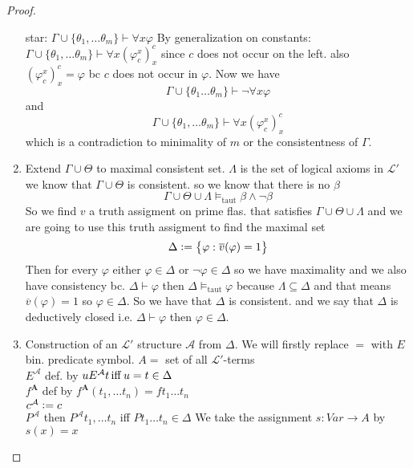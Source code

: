 \begin{proof}
\begin{enumerate}
\begin{claimproof}
            star: $\Gamma \cup \{\theta_1,\dots \theta_m\}\vdash \forall x \varphi$
            By generalization on constants:
            $\Gamma \cup \{\theta_1,\dots \theta_m\}\vdash \forall x (\varphi_c^x)^c_x$
            since $c$ does not occur on the left.
            also $(\varphi^x_c)^c_x = \varphi$ bc $c$ does not occur in $\varphi$.
            Now we have 
            $$\Gamma\cup \{\theta_1 \dots \theta_{m}\}\vdash \lnot \forall x \varphi$$
            and 
            $$\Gamma \cup \{\theta_1,\dots \theta_m\}\vdash \forall x (\varphi_c^x)^c_x$$ 
            which is a contradiction to minimality of $m$ or the consistentness of $\Gamma$.
        \end{claimproof}
        \item Extend $\Gamma \cup \Theta$ to maximal consistent set.
        $\Lambda$ is the set of logical axioms in $\mathcal{L}'$ we know that $\Gamma\cup \Theta$ is consistent. so we know that there is no $\beta$ 
        \[\Gamma \cup \Theta \cup \Lambda  \models_{\text{taut}} \beta \land \lnot \beta\]
        So we find $v$ a truth assigment on prime flas. that satisfies $\Gamma \cup \Theta \cup \Lambda$ and we are going to use this truth assigment to find the maximal set 
        \[\Delta \vcentcolon= \bigl\{\varphi : \overline{v}(\varphi)=1\bigr\}\]
        Then for every $\varphi$ either $\varphi\in \Delta$ or $ \lnot \varphi\in \Delta$ so we have maximality and we also have consistency bc.
        $\Delta \vdash \varphi$ then $\Delta \models_{\text{taut}} \varphi$ because $\Lambda\subseteq \Delta$ and that means 
        $\overline{v}(\varphi)=1$ so $\varphi\in \Delta$.
        So we have that $\Delta$ is consistent. and we say that $\Delta$ is deductively closed i.e. $\Delta\vdash \varphi$ then $\varphi \in \Delta$.
        \item Construction of an $\mathcal{L}'$ structure $\mathcal{A}$ from $\Delta$.
        We will firstly replace $=$ with $E$ bin. predicate symbol.
        $A=$ set of all $\mathcal{L}'$-terms\\
        $E^\mathcal{A}$ def. by $uE^\mathcal{A} t \operatorname{iff} u=t\in \Delta $\\
        $f^\mathbf{A}$ def by $f^\mathbf{A}(t_1,\dots t_n) = ft_1\dots t_n$\\
        $c^\mathcal{A} \vcentcolon= c$\\
        $P^\mathcal{A}$ then $P^\mathcal{A}t_1,\dots t_n$ iff $Pt_1\dots t_n\in \Delta$
        We take the assignment $s:Var \to A$ by $s(x) = x$\\

\end{enumerate}
\end{proof}
